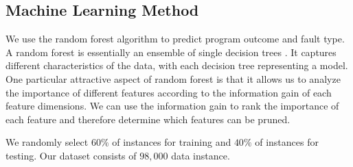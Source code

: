 
\subsection{Machine Learning Method}\label{section:ML}
We use the random forest algorithm to predict program outcome and fault type. A random forest is essentially an ensemble of single decision trees \cite{breiman2001random}. It captures different characteristics of the data, with each decision tree representing a model. One particular attractive aspect of random forest is that it allows us to analyze the importance of different features according to the information gain of each feature dimensions. We can use the information gain to rank the importance of each feature and therefore determine which features can be pruned.





We randomly select $60\%$ of instances for training and $40\%$ of instances for testing. Our dataset consists of $98,000$ data instance.
